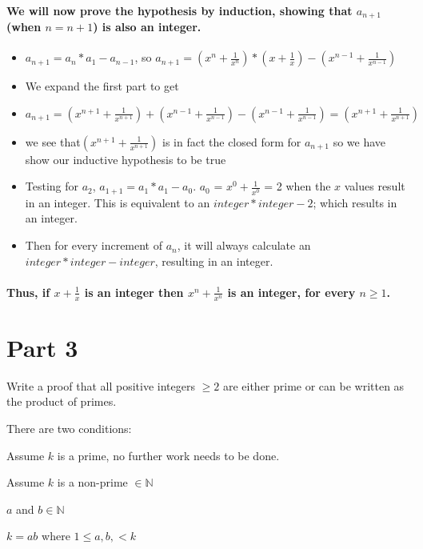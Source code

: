\documentclass{article}
\newcounter{prob}\setcounter{prob}{1}\newcommand{\prob}{\arabic{prob}.\indent \addtocounter{prob}{1}}
\begin{document}
\paragraph{We will now prove the hypothesis by induction, showing that $a_{n+1}$ (when $n=n+1$) is also an integer. }
\begin{itemize}
	\item{$a_{n+1}=a_{n} * a_{1} -a_{n-1}$, so $a_{n+1}=(x^n + \frac{1}{x^n}) * (x + \frac{1}{x})-(x^{n-1} + \frac{1}{x^{n-1}})$}
	\item{We expand the first part to get}
	\item{$a_{n+1}=(x^{n+1}+\frac{1}{x^{n+1}})+(x^{n-1}+\frac{1}{x^{n-1}})-(x^{n-1} + \frac{1}{x^{n-1}})=(x^{n+1}+\frac{1}{x^{n+1}})$}
	\item{ we see that$(x^{n+1}+\frac{1}{x^{n+1}})$ is in fact the closed form for $a_{n+1}$ so we have show our inductive hypothesis to be true} 
	\item{Testing for $a_{2}$, $a_{1+1} = a_{1}*a_{1}-a_{0}$. $a_{0}$ = $x^0 + \frac{1}{x^0}$ = 2 when the $x$ values result in an integer. This is equivalent to an $integer*integer-2$; which results in an integer. }
	\item{Then for every increment of $a_{n}$, it will always calculate an $integer*integer-integer$, resulting in an integer. }
\end{itemize}
\paragraph{Thus, if $x + \frac{1}{x}$ is an integer then  $x^n + \frac{1}{x^n}$ is an integer, for every $\textit{n}\geq1$. }

\newpage
\section{Part 3}

Write a proof that all positive integers $\ge 2$ are either prime or can be written as the product of primes.\vspace{0.5in}

There are two conditions:

\prob Assume $k$ is a prime, no further work needs to be done.

\prob Assume $k$ is a non-prime $\in \mathbb{N}$

$a$ and $b \in \mathbb{N}$

$k = ab$ where $1 \leq a, b, < k$\\
\end{document}
